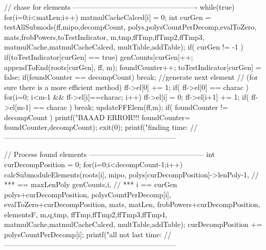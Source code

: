 \begin{ccode}[caption={Aus \url{../Sage/enumeratePCNs.c}},
  firstnumber=1173, label=lst:processFiniteField]
{    // chase for elements ----------------------------------------------------
    while(true){
        for(i=0;i<matLen;i++) matmulCacheCalced[i] = 0;
        int curGen = testAllSubmods(ff,mipo,decompCount,
                polys,polysCountPerDecomp,evalToZero,
                mats,frobPowers,toTestIndicator,
                m,tmp,ffTmp,ffTmp2,ffTmp3,
                matmulCache,matmulCacheCalced,
                multTable,addTable);
        if( curGen != -1 ){
            if(toTestIndicator[curGen] == true){
                genCounts[curGen]++;
                appendToEnd(roots[curGen], ff, m);
                foundCounter++;
                toTestIndicator[curGen] = false;
            }
            if(foundCounter == decompCount) break;
        }
        //generate next element
        // (for sure there is a more efficient method)
        ff->el[0] += 1;
        if( ff->el[0] == charac ){
            for(i=0; i<m-1 && ff->el[i]==charac; i++){
                ff->el[i] = 0;
                ff->el[i+1] += 1;
            }
            if( ff->el[m-1] == charac )
                break;
        }
        updateFFElem(ff,m);
    }
    if( foundCounter != decompCount ){
        printf("BAAAD ERROR!!! foundCounter=%
                foundCounter,decompCount);
        exit(0);
    }
    printf("finding time: %
    //------------------------------------------------------------------------
    


    // Process found elements ------------------------------------------------
    int curDecompPosition = 0;
    for(i=0;i<decompCount-1;i++){
        calcSubmoduleElements(roots[i], mipo,
                polys[curDecompPosition]->lenPoly-1, // *** == maxLenPoly
                genCounts,i, // *** i == curGen
                polys+curDecompPosition, polysCountPerDecomp[i],
                evalToZero+curDecompPosition,
                mats, matLen, frobPowers+curDecompPosition,
                elementsF,
                m,q,tmp,
                ffTmp,ffTmp2,ffTmp3,ffTmp4,
                matmulCache,matmulCacheCalced,
                multTable,addTable);
        curDecompPosition += polysCountPerDecomp[i];
    }
    printf("all not last time: %
    //------------------------------------------------------------------------
    
}
\end{ccode}
